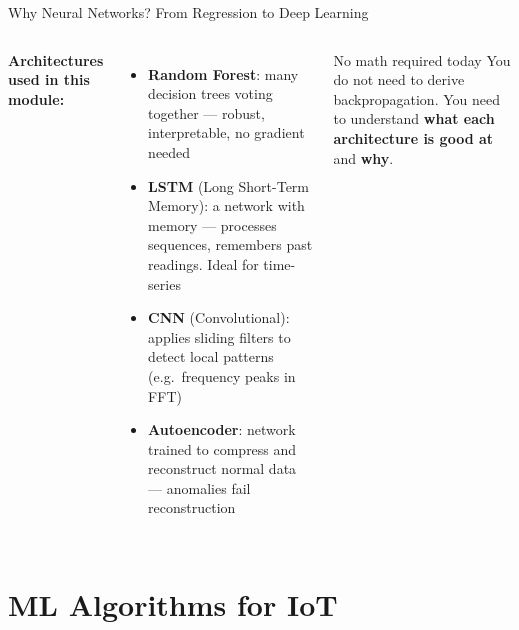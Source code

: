 \documentclass[aspectratio=169,11pt]{beamer}
\begin{document}
\begin{frame}{Why Neural Networks? From Regression to Deep Learning}
\begin{columns}
        \textbf{Architectures used in this module:}
        \begin{itemize}\setlength{\itemsep}{1pt}
            \item \textbf{Random Forest}: many decision trees voting together --- robust, interpretable, no gradient needed
            \item \textbf{LSTM} (Long Short-Term Memory): a network with memory --- processes sequences, remembers past readings. Ideal for time-series
            \item \textbf{CNN} (Convolutional): applies sliding filters to detect local patterns (e.g.\ frequency peaks in FFT)
            \item \textbf{Autoencoder}: network trained to compress and reconstruct normal data --- anomalies fail reconstruction
        \end{itemize}

        \vspace{0.03cm}
        \begin{alertblock}{No math required today}
            You do not need to derive backpropagation. You need to understand \textbf{what each architecture is good at} and \textbf{why}.
        \end{alertblock}
    \end{columns}
\end{frame}

\section{ML Algorithms for IoT}
\end{document}
